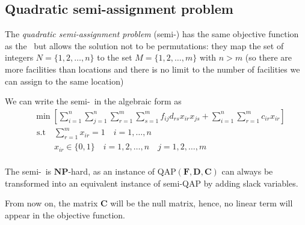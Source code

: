 \subsection{Quadratic semi-assignment problem}
The \textit{quadratic semi-assignment problem} (semi-\QAP) has the same objective function as the \QAP \ but allows the solution not to be permutations: they map the set of integers $ N=\{1,2,\dots,n\}$ to the set $ M=\{1,2,\dots,m\}$ with $n>m$ (so there are more facilities than locations and there is no limit to the number of facilities we can assign to the same location)

We can write the semi-\QAP \ in the algebraic form as
	\begin{equation}
	\label{eq:Semi-qap}
	\begin{split}
	&\min{\left[\sum_{i=1}^n\sum_{j=1}^n\sum_{r=1}^m\sum_{s=1}^mf_{ij}d_{rs}x_{ir}x_{js}+\sum_{i=1}^n\sum_{r=1}^m c_{ir} x_{ir}\right]}\\
	&\text{ s.t} \quad  \sum_{r=1}^m x_{ir} = 1 \quad i=1,\dots,n \\
	&\phantom{\text{ s.t}} \quad  x_{ir}\in \{0,1\} \quad i = 1,2,\dots,n \quad j=1,2,\dots,m\\
	\end{split}
	\end{equation}

\noindent The semi-\QAP \ is $\mathbf{NP}$-hard, as an instance of QAP$(\bm F, \bm D, \bm C)$ can always be transformed into an equivalent instance of semi-QAP by adding slack variables.



From now on, the matrix $\bm C$ will be the null matrix, hence, no linear term will appear in the objective function.